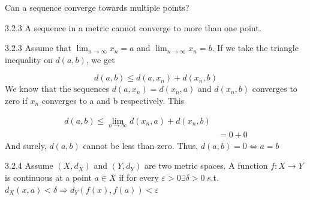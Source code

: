\documentclass[a4paper,norsk]{article}
\renewcommand{\leq}{\leqslant}
\renewcommand{\epsilon}{\varepsilon}
\begin{document}
Can a sequence converge towards multiple points? 

\begin{propositionbox}{3.2.3}{}
A sequence in a metric cannot converge to more than one point.

\begin{proofbox}{3.2.3}{}
  Assume that $ \lim_{n \to \infty} x_n = a  $ and $ \lim_{n \to \infty} x_n = b $. If we take the triangle inequality on $ d(a, b) $, we get
  
  \[
    d(a, b) \leq d(a, x_n) + d(x_n, b)
  \]
  We know that the sequences $ d(a, x_n) = d(x_n, a) $ and $ d(x_n, b) $  converges to zero if $ x_n $ converges to a and b respectively. This

  \begin{align*}
    d(a, b) \leq \lim_{n \to \infty} d(x_n, a) + d(x_n, b) \\
    &= 0+0
  \end{align*}
  And surely, $ d(a, b) $ cannot be less than zero. Thus, $ d(a, b) = 0 \iff a=b $
\end{proofbox}
\end{propositionbox}



\begin{definitionbox}{3.2.4}{}
Assume $ \left( X, d_X \right)  $ and $ \left( Y, d_Y \right)  $ are two metric spaces. A function $ f: X \rightarrow Y $ is continuous at a point $ a \in X $ if for every $ \epsilon > 0 \exists \delta > 0 $ s.t. $ d_X (x, a) < \delta \Rightarrow d_Y (f(x), f(a)) < \epsilon $  
\end{definitionbox}
\end{document}
